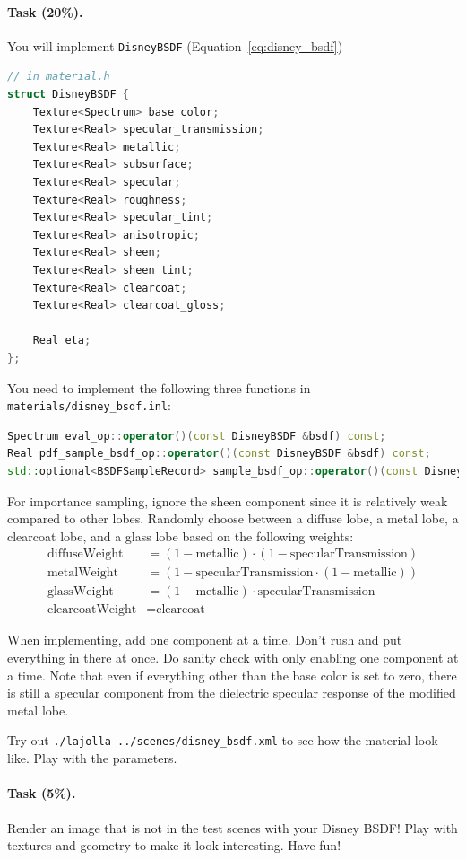 \paragraph{Task (20\%).} You will implement \lstinline{DisneyBSDF} (Equation~\ref{eq:disney_bsdf})
\begin{lstlisting}[language=c++]
// in material.h
struct DisneyBSDF {
    Texture<Spectrum> base_color;
    Texture<Real> specular_transmission;
    Texture<Real> metallic;
    Texture<Real> subsurface;
    Texture<Real> specular;
    Texture<Real> roughness;
    Texture<Real> specular_tint;
    Texture<Real> anisotropic;
    Texture<Real> sheen;
    Texture<Real> sheen_tint;
    Texture<Real> clearcoat;
    Texture<Real> clearcoat_gloss;

    Real eta;
};
\end{lstlisting}

You need to implement the following three functions in \lstinline{materials/disney_bsdf.inl}:
\begin{lstlisting}[language=c++]
Spectrum eval_op::operator()(const DisneyBSDF &bsdf) const;
Real pdf_sample_bsdf_op::operator()(const DisneyBSDF &bsdf) const;
std::optional<BSDFSampleRecord> sample_bsdf_op::operator()(const DisneyBSDF &bsdf) const;
\end{lstlisting}

For importance sampling, ignore the sheen component since it is relatively weak compared to other lobes. Randomly choose between a diffuse lobe, a metal lobe, a clearcoat lobe, and a glass lobe based on the following weights:
\begin{equation}
\begin{aligned}
\text{diffuseWeight} &= (1 - \text{metallic}) \cdot (1 - \text{specularTransmission}) \\
\text{metalWeight} &= (1 - \text{specularTransmission} \cdot (1 - \text{metallic})) \\
\text{glassWeight} &= (1 - \text{metallic}) \cdot \text{specularTransmission} \\
\text{clearcoatWeight} &= \text{clearcoat}
\end{aligned}
\end{equation}

When implementing, add one component at a time. Don't rush and put everything in there at once. Do sanity check with only enabling one component at a time. Note that even if everything other than the base color is set to zero, there is still a specular component from the dielectric specular response of the modified metal lobe. 

Try out \lstinline{./lajolla ../scenes/disney_bsdf.xml} to see how the material look like. Play with the parameters.

\paragraph{Task (5\%).} Render an image that is not in the test scenes with your Disney BSDF! Play with textures and geometry to make it look interesting. Have fun!




